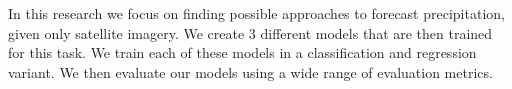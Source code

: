 In this research we focus on finding possible approaches
to forecast precipitation, given only satellite imagery.
We create 3 different models that are then trained for this task.
We train each of these models in a classification and regression variant.
We then evaluate our models using a wide range of evaluation metrics.
